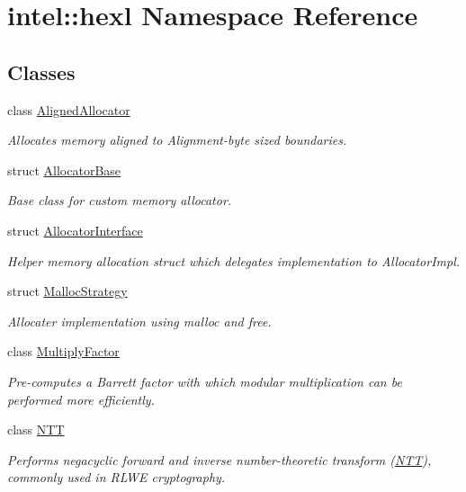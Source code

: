 \hypertarget{namespaceintel_1_1hexl}{}\section{intel\+:\+:hexl Namespace Reference}
\label{namespaceintel_1_1hexl}
\subsection*{Classes}
\begin{DoxyCompactItemize}
\item 
class \hyperlink{classintel_1_1hexl_1_1AlignedAllocator}{Aligned\+Allocator}
\begin{DoxyCompactList}\small\item\em Allocates memory aligned to Alignment-\/byte sized boundaries. \end{DoxyCompactList}\item 
struct \hyperlink{structintel_1_1hexl_1_1AllocatorBase}{Allocator\+Base}
\begin{DoxyCompactList}\small\item\em Base class for custom memory allocator. \end{DoxyCompactList}\item 
struct \hyperlink{structintel_1_1hexl_1_1AllocatorInterface}{Allocator\+Interface}
\begin{DoxyCompactList}\small\item\em Helper memory allocation struct which delegates implementation to Allocator\+Impl. \end{DoxyCompactList}\item 
struct \hyperlink{structintel_1_1hexl_1_1MallocStrategy}{Malloc\+Strategy}
\begin{DoxyCompactList}\small\item\em Allocater implementation using malloc and free. \end{DoxyCompactList}\item 
class \hyperlink{classintel_1_1hexl_1_1MultiplyFactor}{Multiply\+Factor}
\begin{DoxyCompactList}\small\item\em Pre-\/computes a Barrett factor with which modular multiplication can be performed more efficiently. \end{DoxyCompactList}\item 
class \hyperlink{classintel_1_1hexl_1_1NTT}{N\+TT}
\begin{DoxyCompactList}\small\item\em Performs negacyclic forward and inverse number-\/theoretic transform (\hyperlink{classintel_1_1hexl_1_1NTT}{N\+TT}), commonly used in R\+L\+WE cryptography. \end{DoxyCompactList}\end{DoxyCompactItemize}
